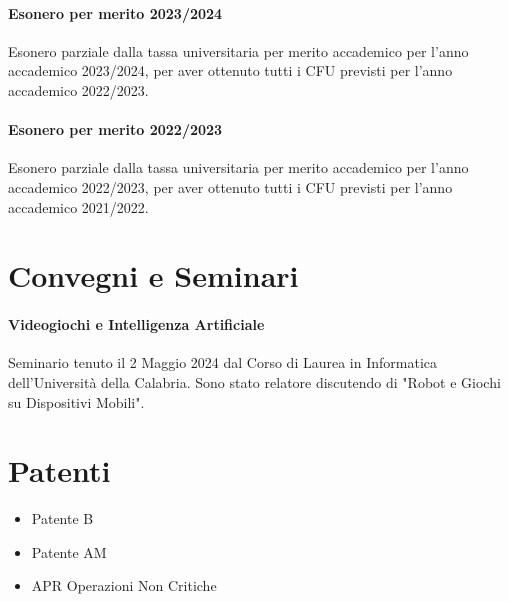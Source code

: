 \documentclass[a4paper, 10pt]{article}
\begin{document}
\paragraph{\textbf{Esonero per merito 2023/2024}}
Esonero parziale dalla tassa universitaria per merito accademico per l'anno accademico 2023/2024, per aver ottenuto tutti i CFU previsti per l'anno accademico 2022/2023.

\paragraph{\textbf{Esonero per merito 2022/2023}}
Esonero parziale dalla tassa universitaria per merito accademico per l'anno accademico 2022/2023, per aver ottenuto tutti i CFU previsti per l'anno accademico 2021/2022.

\section{Convegni e Seminari}

\paragraph{\textbf{Videogiochi e Intelligenza Artificiale}}
Seminario tenuto il 2 Maggio 2024 dal Corso di Laurea in Informatica dell'Università della Calabria. Sono stato relatore discutendo di "Robot e Giochi su Dispositivi Mobili".


\section{Patenti}

\begin{itemize}
    \item Patente B
    \item Patente AM
    \item APR Operazioni Non Critiche
\end{itemize}
\end{document}
